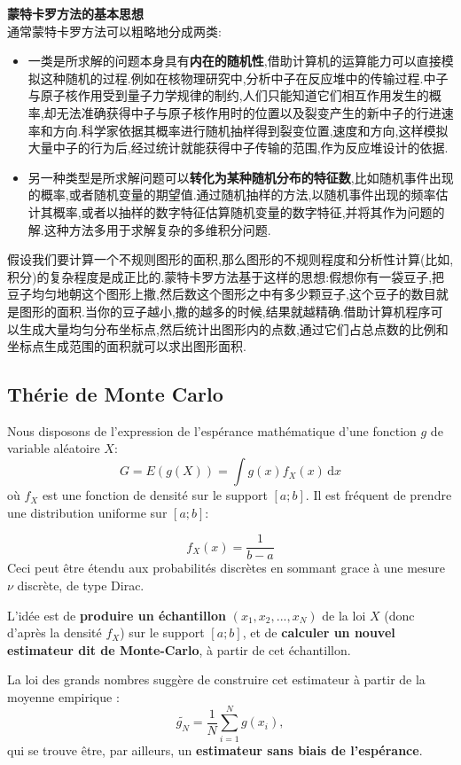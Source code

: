 \documentclass{article}
\begin{document}
\textbf{蒙特卡罗方法的基本思想}\\
通常蒙特卡罗方法可以粗略地分成两类:
\begin{itemize}
\item 一类是所求解的问题本身具有\textbf{内在的随机性},借助计算机的运算能力可以直接模拟这种随机的过程.例如在核物理研究中,分析中子在反应堆中的传输过程.中子与原子核作用受到量子力学规律的制约,人们只能知道它们相互作用发生的概率,却无法准确获得中子与原子核作用时的位置以及裂变产生的新中子的行进速率和方向.科学家依据其概率进行随机抽样得到裂变位置,速度和方向,这样模拟大量中子的行为后,经过统计就能获得中子传输的范围,作为反应堆设计的依据.
\item 另一种类型是所求解问题可以\textbf{转化为某种随机分布的特征数},比如随机事件出现的概率,或者随机变量的期望值.通过随机抽样的方法,以随机事件出现的频率估计其概率,或者以抽样的数字特征估算随机变量的数字特征,并将其作为问题的解.这种方法多用于求解复杂的多维积分问题.
\end{itemize}
假设我们要计算一个不规则图形的面积,那么图形的不规则程度和分析性计算(比如,积分)的复杂程度是成正比的.蒙特卡罗方法基于这样的思想:假想你有一袋豆子,把豆子均匀地朝这个图形上撒,然后数这个图形之中有多少颗豆子,这个豆子的数目就是图形的面积.当你的豆子越小,撒的越多的时候,结果就越精确.借助计算机程序可以生成大量均匀分布坐标点,然后统计出图形内的点数,通过它们占总点数的比例和坐标点生成范围的面积就可以求出图形面积.

\subsection{Th\'erie de Monte Carlo}
Nous disposons de l'expression de l'esp\'erance math\'ematique d'une fonction $g$ de variable al\'eatoire $X$:
$$ G = E(g(X))=\int g(x)f_X(x) \, \mbox{d}x $$
o\`u $f_X$ est une fonction de densit\'e sur le support $[a;b]$. Il est fr\'equent de prendre une distribution uniforme sur $[a;b]$:

$$ f_X(x) = \frac{1}{b-a} $$
Ceci peut \^etre \'etendu aux probabilit\'es discr\`etes en sommant grace \`a une mesure $\nu$ discr\`ete, de type Dirac.

L'id\'ee est de \textbf{produire un \'echantillon} $(x_1,x_2,...,x_N)$ de la loi $X$ (donc d'apr\`es la densit\'e $f_X$) sur le support $[a;b]$, et de \textbf{calculer un nouvel estimateur dit de Monte-Carlo}, \`a partir de cet \'echantillon.

La loi des grands nombres sugg\`ere de construire cet estimateur \`a partir de la moyenne empirique :
$$ \tilde{g_N} = \frac{1}{N} \sum_{i=1}^{N} g(x_i), $$
qui se trouve \^etre, par ailleurs, un \textbf{estimateur sans biais de l'esp\'erance}.
\end{document}
